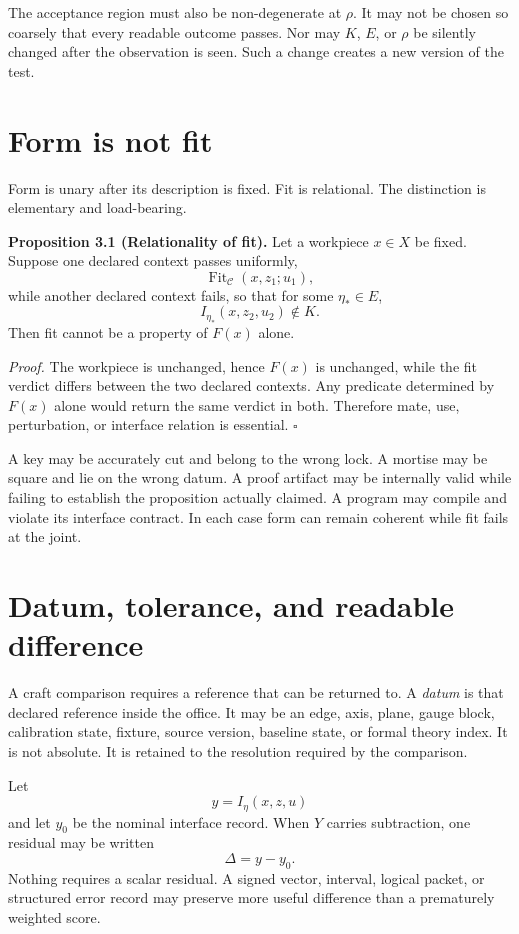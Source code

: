 \documentclass[11pt]{article}
\newcommand{\Fit}{\operatorname{Fit}}
\begin{document}
The acceptance region must also be non-degenerate at $\rho$. It may not be chosen so coarsely that every readable outcome passes. Nor may $K$, $E$, or $\rho$ be silently changed after the observation is seen. Such a change creates a new version of the test.

\section{Form is not fit}

Form is unary after its description is fixed. Fit is relational. The distinction is elementary and load-bearing.

\textbf{Proposition 3.1 (Relationality of fit).}
Let a workpiece $x\in X$ be fixed. Suppose one declared context passes uniformly,
\[
\Fit_{\mathcal C}(x,z_1;u_1),
\]
while another declared context fails, so that for some $\eta_*\in E$,
\[
I_{\eta_*}(x,z_2,u_2)\notin K.
\]
Then fit cannot be a property of $F(x)$ alone.

\textit{Proof.}
The workpiece is unchanged, hence $F(x)$ is unchanged, while the fit verdict differs between the two declared contexts. Any predicate determined by $F(x)$ alone would return the same verdict in both. Therefore mate, use, perturbation, or interface relation is essential. \hfill$\square$

A key may be accurately cut and belong to the wrong lock. A mortise may be square and lie on the wrong datum. A proof artifact may be internally valid while failing to establish the proposition actually claimed. A program may compile and violate its interface contract. In each case form can remain coherent while fit fails at the joint.

\section{Datum, tolerance, and readable difference}

A craft comparison requires a reference that can be returned to. A \emph{datum} is that declared reference inside the office. It may be an edge, axis, plane, gauge block, calibration state, fixture, source version, baseline state, or formal theory index. It is not absolute. It is retained to the resolution required by the comparison.

Let
\[
y=I_\eta(x,z,u)
\]
and let $y_0$ be the nominal interface record. When $Y$ carries subtraction, one residual may be written
\[
\Delta=y-y_0.
\]
Nothing requires a scalar residual. A signed vector, interval, logical packet, or structured error record may preserve more useful difference than a prematurely weighted score.
\end{document}

